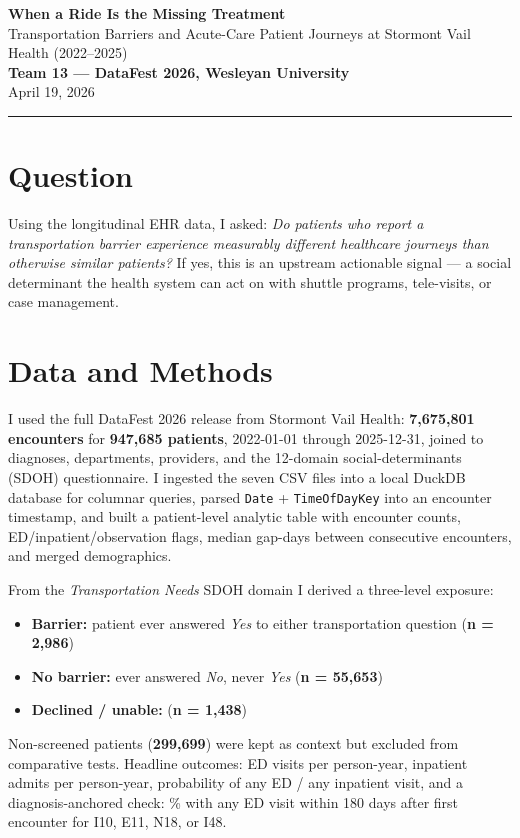\documentclass[9pt]{article}
\begin{document}
{\Large \textbf{When a Ride Is the Missing Treatment}}\\[-0.15em]
{\normalsize Transportation Barriers and Acute-Care Patient Journeys at Stormont Vail Health (2022--2025)}\\[0.1em]
\textbf{Team 13 --- DataFest 2026, Wesleyan University}\\
April 19, 2026
\vspace{0.12em}

\hrule
\vspace{0.1em}
\small

\section*{\textcolor{accent}{Question}}
Using the longitudinal EHR data, I asked: \textit{Do patients who report a transportation barrier experience measurably different healthcare journeys than otherwise similar patients?} If yes, this is an upstream actionable signal --- a social determinant the health system can act on with shuttle programs, tele-visits, or case management.

\section*{\textcolor{accent}{Data and Methods}}
I used the full DataFest 2026 release from Stormont Vail Health: \textbf{7,675,801 encounters} for \textbf{947,685 patients}, 2022-01-01 through 2025-12-31, joined to diagnoses, departments, providers, and the 12-domain social-determinants (SDOH) questionnaire. I ingested the seven CSV files into a local DuckDB database for columnar queries, parsed \texttt{Date} + \texttt{TimeOfDayKey} into an encounter timestamp, and built a patient-level analytic table with encounter counts, ED/inpatient/observation flags, median gap-days between consecutive encounters, and merged demographics.

From the \textit{Transportation Needs} SDOH domain I derived a three-level exposure:
\begin{itemize}
  \item \textbf{Barrier:} patient ever answered \textit{Yes} to either transportation question (\textbf{n = 2,986})
  \item \textbf{No barrier:} ever answered \textit{No}, never \textit{Yes} (\textbf{n = 55,653})
  \item \textbf{Declined / unable:} (\textbf{n = 1,438})
\end{itemize}
Non-screened patients (\textbf{299,699}) were kept as context but excluded from comparative tests. Headline outcomes: ED visits per person-year, inpatient admits per person-year, probability of any ED / any inpatient visit, and a diagnosis-anchored check: \% with any ED visit within 180 days after first encounter for I10, E11, N18, or I48.
\end{document}
